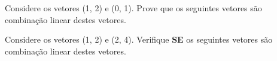 \documentclass[12pt]{exam}
\begin{document}
\begin{questions}


    \question Considere os vetores (1, 2) e (0, 1).
    Prove que os seguintes vetores são 
    combinação linear destes vetores.


    \question Considere os vetores (1, 2) e (2, 4).
    Verifique \textbf{SE} os seguintes vetores são
    combinação linear destes vetores.

\end{questions}
\end{document}
